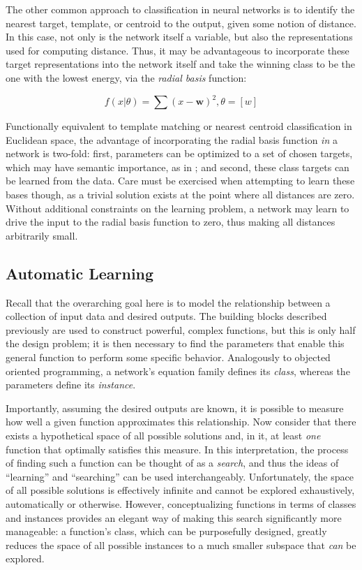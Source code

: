 The other common approach to classification in neural networks is to identify the nearest target, template, or centroid to the output, given some notion of distance.
In this case, not only is the network itself a variable, but also the representations used for computing distance.
Thus, it may be advantageous to incorporate these target representations into the network itself and take the winning class to be the one with the lowest energy, via the \emph{radial basis} function:

\begin{equation}
f(x | \theta) = \sum(x - \mathbf{w})^2, \theta = [w]
\end{equation}

\noindent Functionally equivalent to template matching or nearest centroid classification in Euclidean space, the advantage of incorporating the radial basis function \emph{in} a network is two-fold:
first, parameters can be optimized to a set of chosen targets, which may have semantic importance, as in \cite{LeCun1998Gradient};
and second, these class targets can be learned from the data.
Care must be exercised when attempting to learn these bases though, as a trivial solution exists at the point where all distances are zero.
Without additional constraints on the learning problem, a network may learn to drive the input to the radial basis function to zero, thus making all distances arbitrarily small.


\subsection{Automatic Learning}
\label{subsec:learning}

Recall that the overarching goal here is to model the relationship between a collection of input data and desired outputs.
The building blocks described previously are used to construct powerful, complex functions, but this is only half the design problem;
it is then necessary to find the parameters that enable this general function to perform some specific behavior.
Analogously to objected oriented programming, a network's equation family defines its \emph{class}, whereas the parameters define its \emph{instance}.

Importantly, assuming the desired outputs are known, it is possible to measure how well a given function approximates this relationship.
Now consider that there exists a hypothetical space of all possible solutions and, in it, at least \emph{one} function that optimally satisfies this measure.
In this interpretation, the process of finding such a function can be thought of as a \emph{search}, and thus the ideas of ``learning'' and ``searching'' can be used interchangeably.
Unfortunately, the space of all possible solutions is effectively infinite and cannot be explored exhaustively, automatically or otherwise.
However, conceptualizing functions in terms of classes and instances provides an elegant way of making this search significantly more manageable:
a function's class, which can be purposefully designed, greatly reduces the space of all possible instances to a much smaller subspace that \emph{can} be explored.

